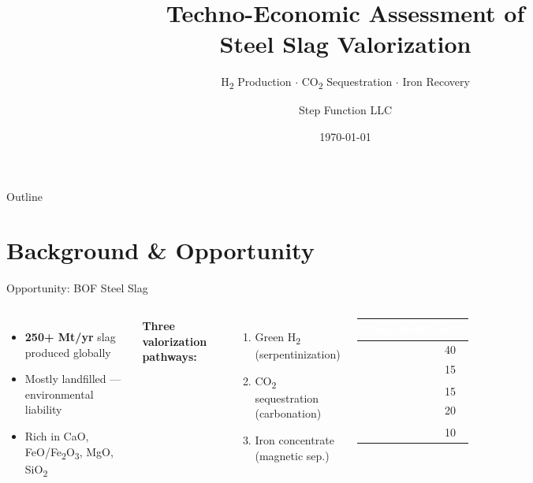 \documentclass[aspectratio=169]{beamer}
\title{Techno-Economic Assessment of\\[4pt] \textbf{Steel Slag} Valorization}
\subtitle{H\textsubscript{2} Production $\cdot$ CO\textsubscript{2} Sequestration $\cdot$ Iron Recovery}
\author{Step Function LLC}
\date{\today}
\begin{document}
\begin{frame}
\titlepage
\end{frame}

\begin{frame}{Outline}
\tableofcontents
\end{frame}

\section{Background \& Opportunity}

\begin{frame}{Opportunity: BOF Steel Slag}
\begin{columns}
\begin{itemize}
    \item \textbf{250+ Mt/yr} slag produced globally
    \item Mostly landfilled — environmental liability
    \item Rich in CaO, FeO/Fe\textsubscript{2}O\textsubscript{3}, MgO, SiO\textsubscript{2}
\end{itemize}
\vspace{8pt}
\textbf{Three valorization pathways:}
\begin{enumerate}
    \item Green H\textsubscript{2} (serpentinization)
    \item CO\textsubscript{2} sequestration (carbonation)
    \item Iron concentrate (magnetic sep.)
\end{enumerate}

\begin{table}
\centering
\small
\begin{tabular}{@{}lS[table-format=2.0]@{}}
\toprule
\textbf{\textcolor{white}{Component}} & \textbf{\textcolor{white}{wt\%}} \\
\midrule
\textcolor{white}{CaO}                & 40 \\
\textcolor{white}{Fe\textsubscript{2}O\textsubscript{3}} & 15 \\
\textcolor{white}{FeO}                & 15 \\
\textcolor{white}{SiO\textsubscript{2}} & 20 \\
\textcolor{white}{MgO}                & 10 \\
\bottomrule
\end{tabular}
\end{table}
\end{columns}
\end{frame}
\end{document}
